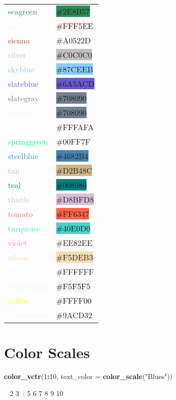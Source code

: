 \documentclass[
]{article}
\newenvironment{Shaded}{\begin{snugshade}}{\end{snugshade}}
\newcommand{\DataTypeTok}[1]{\textcolor[rgb]{0.13,0.29,0.53}{#1}}
\newcommand{\DecValTok}[1]{\textcolor[rgb]{0.00,0.00,0.81}{#1}}
\newcommand{\KeywordTok}[1]{\textcolor[rgb]{0.13,0.29,0.53}{\textbf{#1}}}
\newcommand{\NormalTok}[1]{#1}
\newcommand{\OperatorTok}[1]{\textcolor[rgb]{0.81,0.36,0.00}{\textbf{#1}}}
\newcommand{\StringTok}[1]{\textcolor[rgb]{0.31,0.60,0.02}{#1}}
\begin{document}
\begin{longtable}[]{@{}ll@{}}
\textcolor{seagreen}{seagreen} &
\colorbox{seagreen}{\#2E8B57}\tabularnewline
\textcolor{seashell}{seashell} &
\colorbox{seashell}{\#FFF5EE}\tabularnewline
\textcolor{sienna}{sienna} &
\colorbox{mediumcarmine}{\#A0522D}\tabularnewline
\textcolor{silver}{silver} & \colorbox{silver}{\#C0C0C0}\tabularnewline
\textcolor{skyblue}{skyblue} &
\colorbox{lightskyblue}{\#87CEEB}\tabularnewline
\textcolor{slateblue}{slateblue} &
\colorbox{slateblue}{\#6A5ACD}\tabularnewline
\textcolor{slategray}{slategray} &
\colorbox{slategray}{\#708090}\tabularnewline
\textcolor{aliceblue}{slategrey} &
\colorbox{slategray}{\#708090}\tabularnewline
\textcolor{snow}{snow} & \colorbox{snow}{\#FFFAFA}\tabularnewline
\textcolor{springgreen}{springgreen} &
\colorbox{guppiegreen}{\#00FF7F}\tabularnewline
\textcolor{steelblue}{steelblue} &
\colorbox{steelblue}{\#4682B4}\tabularnewline
\textcolor{tan}{tan} & \colorbox{tan}{\#D2B48C}\tabularnewline
\textcolor{teal}{teal} & \colorbox{teal}{\#008080}\tabularnewline
\textcolor{thistle}{thistle} &
\colorbox{thistle}{\#D8BFD8}\tabularnewline
\textcolor{tomato}{tomato} & \colorbox{tomato}{\#FF6347}\tabularnewline
\textcolor{turquoise}{turquoise} &
\colorbox{mediumturquoise}{\#40E0D0}\tabularnewline
\textcolor{violet}{violet} &
\colorbox{lavendermagenta}{\#EE82EE}\tabularnewline
\textcolor{wheat}{wheat} & \colorbox{wheat}{\#F5DEB3}\tabularnewline
\textcolor{white}{white} & \colorbox{white}{\#FFFFFF}\tabularnewline
\textcolor{whitesmoke}{whitesmoke} &
\colorbox{whitesmoke}{\#F5F5F5}\tabularnewline
\textcolor{yellow}{yellow} &
\colorbox{electricyellow}{\#FFFF00}\tabularnewline
\textcolor{aliceblue}{yellowgreen} &
\colorbox{yellow-green}{\#9ACD32}\tabularnewline
\bottomrule
\end{longtable}

\hypertarget{color-scales}{%
\section{Color Scales}\label{color-scales}}

\begin{Shaded}
\begin{Highlighting}[]
\KeywordTok{color_vctr}\NormalTok{(}\DecValTok{1}\OperatorTok{:}\DecValTok{10}\NormalTok{, }\DataTypeTok{text_color =} \KeywordTok{color_scale}\NormalTok{(}\StringTok{"Blues"}\NormalTok{))}
\end{Highlighting}
\end{Shaded}

\textcolor{ghostwhite}{1} \textcolor{lightlavender}{2}
\textcolor{beaublue}{3} \textcolor{lightblue}{4}
\textcolor{carolinablue}{5} \textcolor{bluegray}{6}
\textcolor{tuftsblue}{7} \textcolor{denim}{8}
\textcolor{mediumelectricblue}{9} \textcolor{darkmidnightblue}{10}
\end{document}
